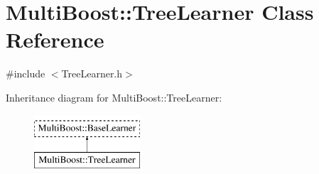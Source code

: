 \hypertarget{classMultiBoost_1_1TreeLearner}{
\section{MultiBoost::TreeLearner Class Reference}
\label{classMultiBoost_1_1TreeLearner}
}


{\ttfamily \#include $<$TreeLearner.h$>$}

Inheritance diagram for MultiBoost::TreeLearner:\begin{figure}[H]
\begin{center}
\leavevmode
\includegraphics[height=2.000000cm]{classMultiBoost_1_1TreeLearner}
\end{center}
\end{figure}
